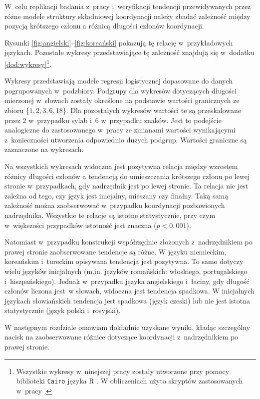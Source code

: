 W~celu replikacji badania z~pracy \cite{przepiorkowski2023conjunct} i~weryfikacji tendencji przewidywanych przez różne modele struktury składniowej koordynacji należy zbadać zależność między pozycją krótszego członu a różnicą długości członów koordynacji.

Rysunki \ref{fig:angielski}--\ref{fig:koreański} pokazują tę relację w~przykładowych językach. Pozostałe wykresy przedstawiające tę zależność znajdują się w~dodatku \ref{dod:wykresy}\footnote{
Wszystkie wykresy w~ninejszej pracy zostały utworzone przy pomocy biblioteki \texttt{Cairo} języka R \citep{R2023}. W obliczeniach użyto skryptów zastosowanych w~pracy \cite{przepiorkowski2023conjunct}.}.

Wykresy przedstawiają modele regresji logistycznej dopasowane do danych pogrupowanych w~podzbiory. Podgrupy dla wykresów dotyczących długości mierzonej w~słowach zostały określone na podstawie wartości granicznych ze zbioru \{$1, 2, 3, 6, 18$\}. Dla pozostałych wykresów wartości te są przeskalowane przez 2 w~przypadku sylab i~6 w~przypadku znaków. Jest to podejście analogiczne do zastosowanego w~pracy \cite{przepiorkowski2023conjunct} ze zmianami wartości wynikającymi z~konieczności utworzenia odpowiednio dużych podgrup. Wartości graniczne są zaznaczone na wykresach. 

Na wszystkich wykresach widoczna jest pozytywna relacja między wzrostem różnicy długości członów a tendencją do umieszczania krótszego członu po lewej stronie w~przypadkach, gdy nadrzędnik jest po lewej stronie. Ta relacja nie jest zależna od tego, czy język jest inicjalny, mieszany czy finalny. Taką samą zależność można zaobserwować w~przypadku koordynacji pozbawionych nadrzędnika. Wszystkie te relacje są istotne statystycznie, przy czym w~większości przypadków istotność jest znaczna ($p<0{,}001$).

Natomiast w~przypadku konstrukcji współrzędnie złożonych z~nadrzędnikiem po prawej stronie zaobserwowane tendencje są różne. W języku niemieckim, koreańskim i~tureckim opisywana tendencja jest pozytywna. To samo dotyczy wielu języków inicjalnych (m.in. języków romańskich: włoskiego,  portugalskiego i~hiszpańskiego). Jednak w~przypadku języka angielskiego i~łaciny, gdy długość członów liczona jest~w słowach, widoczna jest tendencja spadkowa. W inicjalnych językach słowiańskich tendencja jest spadkowa (język czeski) lub nie jest istotna statystycznie (język polski i~rosyjski). 

W następnym rozdziale omawiam dokładnie uzyskane wyniki, kładąc szczególny nacisk na zaobserwowane różnice dotyczące koordynacji z~nadrzędnikiem po prawej stronie.

